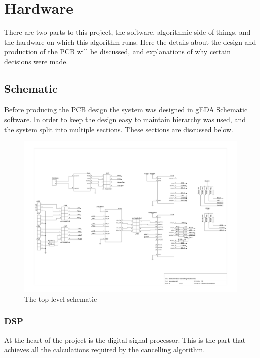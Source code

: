 \section{Hardware}

There are two parts to this project, the software, algorithmic side of things, and the hardware on which this algorithm runs.
Here the details about the design and production of the PCB will be discussed, and explanations of why certain decisions were made.

\subsection{Schematic}
\label{sec:imple:hard:sch}
Before producing the PCB design the system was designed in gEDA Schematic software.
In order to keep the design easy to maintain hierarchy was used, and the system split into multiple sections.
These sections are discussed below.

\begin{figure}[H]
	\centering
	\includegraphics[width=\textwidth]{./img/overview.png}
	\caption{The top level schematic}
	\label{fig:overviewsch}
\end{figure}

\subsubsection{DSP}
At the heart of the project is the digital signal processor.
This is the part that achieves all the calculations required by the cancelling algorithm.

